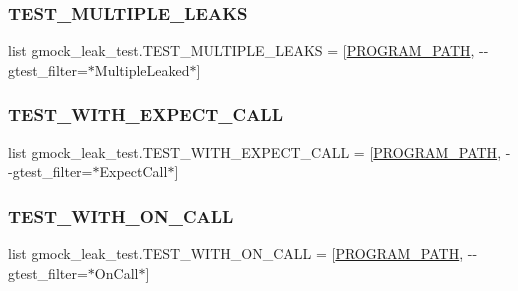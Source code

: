 \subsubsection{\texorpdfstring{TEST\_MULTIPLE\_LEAKS}{TEST\_MULTIPLE\_LEAKS}}
{\footnotesize\ttfamily list gmock\+\_\+leak\+\_\+test.\+T\+E\+S\+T\+\_\+\+M\+U\+L\+T\+I\+P\+L\+E\+\_\+\+L\+E\+A\+KS = \mbox{[}\mbox{\hyperlink{namespacegmock__leak__test_ace925116117368cd02a7b45571f5133d}{P\+R\+O\+G\+R\+A\+M\+\_\+\+P\+A\+TH}}, \textquotesingle{}-\/-\/gtest\+\_\+filter=$\ast$Multiple\+Leaked$\ast$\textquotesingle{}\mbox{]}}

\mbox{\label{namespacegmock__leak__test_aa03214d2fad1ee0fd3f3101da688ebfc}} 
\subsubsection{\texorpdfstring{TEST\_WITH\_EXPECT\_CALL}{TEST\_WITH\_EXPECT\_CALL}}
{\footnotesize\ttfamily list gmock\+\_\+leak\+\_\+test.\+T\+E\+S\+T\+\_\+\+W\+I\+T\+H\+\_\+\+E\+X\+P\+E\+C\+T\+\_\+\+C\+A\+LL = \mbox{[}\mbox{\hyperlink{namespacegmock__leak__test_ace925116117368cd02a7b45571f5133d}{P\+R\+O\+G\+R\+A\+M\+\_\+\+P\+A\+TH}}, \textquotesingle{}-\/-\/gtest\+\_\+filter=$\ast$Expect\+Call$\ast$\textquotesingle{}\mbox{]}}

\mbox{\label{namespacegmock__leak__test_a5b7e5890b4022a37ef82bdf4eb22ef44}} 
\subsubsection{\texorpdfstring{TEST\_WITH\_ON\_CALL}{TEST\_WITH\_ON\_CALL}}
{\footnotesize\ttfamily list gmock\+\_\+leak\+\_\+test.\+T\+E\+S\+T\+\_\+\+W\+I\+T\+H\+\_\+\+O\+N\+\_\+\+C\+A\+LL = \mbox{[}\mbox{\hyperlink{namespacegmock__leak__test_ace925116117368cd02a7b45571f5133d}{P\+R\+O\+G\+R\+A\+M\+\_\+\+P\+A\+TH}}, \textquotesingle{}-\/-\/gtest\+\_\+filter=$\ast$On\+Call$\ast$\textquotesingle{}\mbox{]}}

